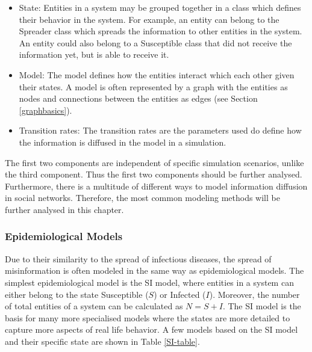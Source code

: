 \begin{itemize}
    \item State: Entities in a system may be grouped together in a class which
    defines their behavior in the system. For example, 
    an entity can belong to the  \glqq Spreader \grqq{} class which 
    spreads the information
    to other entities in the system. An entity could also belong to a
    \glqq Susceptible \grqq{} class that did not receive the information yet, 
    but is able to receive it.
    \item Model: The model defines how the entities interact which each other
    given their states. A model is often represented by a graph with the entities
    as nodes and connections between the entities as edges 
    (see Section \ref{graphbasics}).
    \item Transition rates: The transition rates are the parameters used
    do define how the information is diffused in the model in a simulation. 
\end{itemize}

The first two components are independent of specific simulation scenarios,
unlike the third component. Thus the first two components should be further
analysed. Furthermore, there is a multitude of different ways 
to model information diffusion in social networks. Therefore, the most common
modeling methods will be further analysed in this chapter.

\subsubsection{Epidemiological Models}

Due to their similarity to the spread of infectious diseases, 
the spread of misinformation is often modeled in the same way as epidemiological models.
The simplest epidemiological model is the SI model, where entities in a system
can either belong to the state \glqq Susceptible\grqq{} ($S$) or 
\glqq Infected\grqq{} ($I$). Moreover, the number of total entities of a 
system can be calculated as $N=S+I$. The SI model is the basis for many
more specialised models where the states are more detailed to capture more 
aspects of real life behavior. A few models based on the SI model and their 
specific state are shown in Table \ref{SI-table}.


